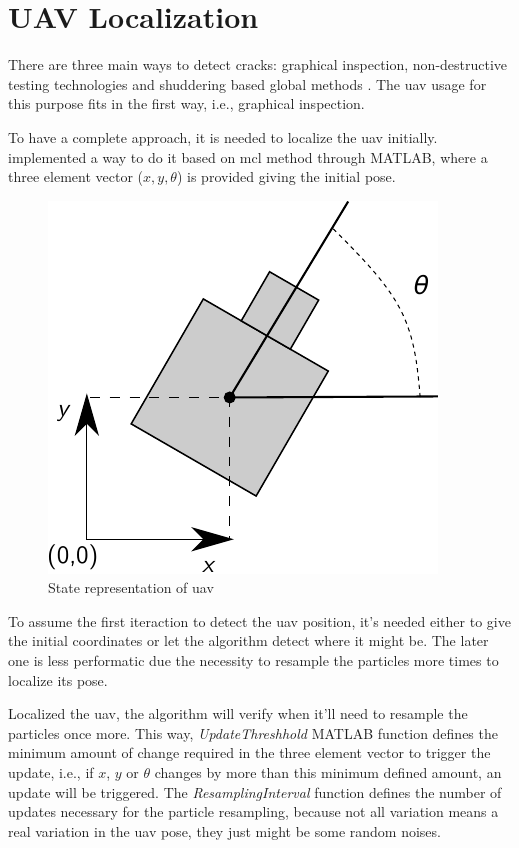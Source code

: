 \section{UAV Localization}

There are three main ways to detect cracks: graphical inspection, non-destructive testing technologies and shuddering based global methods \citep{prashanth_addagatla_modern_nodate}. The \gls*{uav} usage for this purpose fits in the first way, i.e., graphical inspection.

To have a complete approach, it is needed to localize the \gls*{uav} initially. \citet{sushant_localization_2017} implemented a way to do it based on \gls*{mcl} method through MATLAB, where a three element vector (\(x,y,\theta\)) is provided giving the initial pose.
%
\begin{figure}[H]
    \centering
    \includegraphics{figures/uav_localization.pdf}
    \caption{State representation of \gls*{uav}}
\end{figure}

To assume the first iteraction to detect the \gls*{uav} position, it's needed either to give the initial coordinates or let the algorithm detect where it might be.
The later one is less performatic due the necessity to resample the particles more times to localize its pose.

Localized the \gls*{uav}, the algorithm will verify when it'll need to resample the particles once more. This way, \emph{UpdateThreshhold} MATLAB function defines the minimum amount of change required in the three element vector to trigger the update, i.e., if \(x\), \(y\) or \(\theta\) changes by more than this minimum defined amount, an update will be triggered. The \emph{ResamplingInterval} function defines the number of updates necessary for the particle resampling, because not all variation means a real variation in the \gls*{uav} pose, they just might be some random noises.

